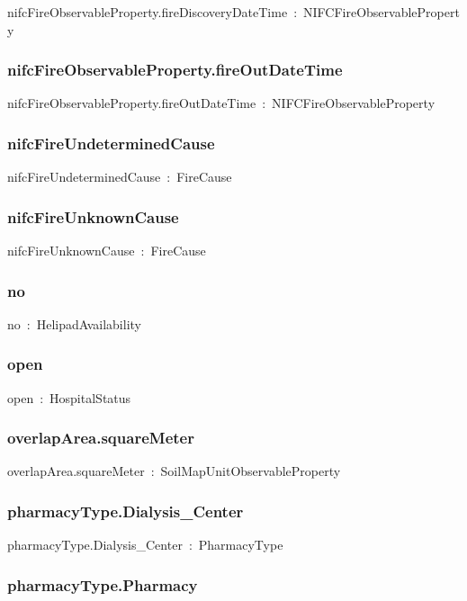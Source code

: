 \documentclass{article}
\begin{document}
nifcFireObservableProperty.fireDiscoveryDateTime~:~NIFCFireObservableProperty

\subsubsection*{nifcFireObservableProperty.fireOutDateTime}

nifcFireObservableProperty.fireOutDateTime~:~NIFCFireObservableProperty

\subsubsection*{nifcFireUndeterminedCause}

nifcFireUndeterminedCause~:~FireCause

\subsubsection*{nifcFireUnknownCause}

nifcFireUnknownCause~:~FireCause

\subsubsection*{no}

no~:~HelipadAvailability

\subsubsection*{open}

open~:~HospitalStatus

\subsubsection*{overlapArea.squareMeter}

overlapArea.squareMeter~:~SoilMapUnitObservableProperty

\subsubsection*{pharmacyType.Dialysis\_Center}

pharmacyType.Dialysis\_Center~:~PharmacyType

\subsubsection*{pharmacyType.Pharmacy}
\end{document}
